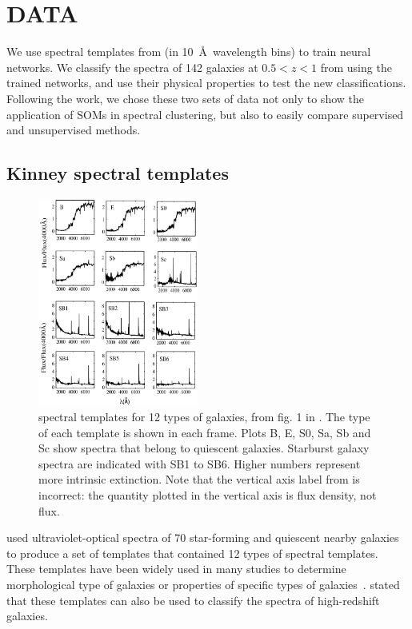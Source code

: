 \section{DATA}
\label{sec: data_highZ}
We use spectral templates from  (in 10~\AA\ wavelength bins) to train neural networks. 
We classify the spectra of 142 galaxies at $0.5<z<1$ from  using the trained networks, and use their physical properties to test the new classifications.
Following the  work, we chose these two sets of data not only to show the application of SOMs in spectral clustering, but also to easily compare supervised and unsupervised methods.


 \subsection{Kinney spectral templates}
     \begin{figure}
        \centering
        \includegraphics[width=0.47\textwidth]{images/k96.jpg}
        \caption {\citet{Kinney96} spectral templates for 12 types of galaxies, from fig. 1 in \citet{Hossein12}. The type of each template is shown in each frame. Plots B, E, S0, Sa, Sb and Sc show spectra that belong to quiescent galaxies. Starburst galaxy spectra are indicated with SB1 to SB6. Higher numbers represent more intrinsic extinction. Note that the vertical axis label from \citet{Hossein12} is incorrect:  the quantity plotted in the vertical axis is flux density, not flux.}
        \label{fig: k96}
    \end{figure}
      
     used ultraviolet-optical spectra of 70 star-forming and quiescent nearby galaxies to produce a set of templates that contained 12 types of spectral templates.
    These templates have been widely used in many studies to determine morphological type of galaxies or properties of specific types of galaxies~\citep[e.g.][]{Shakouri16, Paiano16, Laporte16, Holden16}.
     stated that these templates can also be used to classify the spectra of high-redshift galaxies. 
    
